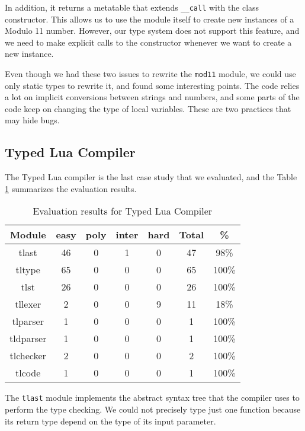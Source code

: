 In addition, it returns a metatable that extends \texttt{\string_\string_call}
with the class constructor.
This allows us to use the module itself to create new instances of a
Modulo 11 number.
However, our type system does not support this feature, and we need to
make explicit calls to the constructor whenever we want to create a
new instance.

Even though we had these two issues to rewrite the \texttt{mod11} module,
we could use only static types to rewrite it, and found some interesting
points.
The code relies a lot on implicit conversions between strings and numbers,
and some parts of the code keep on changing the type of local variables.
These are two practices that may hide bugs.

\subsection{Typed Lua Compiler}

The Typed Lua compiler is the last case study that we evaluated, and the
Table \ref{tab:evaltlc} summarizes the evaluation results.

\begin{table}[!ht]
\begin{center}
\begin{tabular}{|c|c|c|c|c|c|c|}
\hline
\textbf{Module} & \textbf{easy} & \textbf{poly} & \textbf{inter} & \textbf{hard} & \textbf{Total} & \textbf{\%} \\
\hline
tlast & 46 & 0 & 1 & 0 & 47 & 98\% \\
\hline
tltype & 65 & 0 & 0 & 0 & 65 & 100\% \\
\hline
tlst & 26 & 0 & 0 & 0 & 26 & 100\% \\
\hline
tllexer & 2 & 0 & 0 & 9 & 11 & 18\% \\
\hline
tlparser & 1 & 0 & 0 & 0 & 1 & 100\% \\
\hline
tldparser & 1 & 0 & 0 & 0 & 1 & 100\% \\
\hline
tlchecker & 2 & 0 & 0 & 0 & 2 & 100\% \\
\hline
tlcode & 1 & 0 & 0 & 0 & 1 & 100\% \\
\hline
\end{tabular}
\end{center}
\caption{Evaluation results for Typed Lua Compiler}
\label{tab:evaltlc}
\end{table}

The \texttt{tlast} module implements the abstract syntax tree that
the compiler uses to perform the type checking.
We could not precisely type just one function because its return
type depend on the type of its input parameter.

